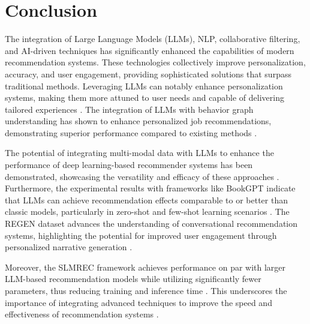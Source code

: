 \section{Conclusion} \label{sec:Conclusion}







The integration of Large Language Models (LLMs), NLP, collaborative filtering, and AI-driven techniques has significantly enhanced the capabilities of modern recommendation systems. These technologies collectively improve personalization, accuracy, and user engagement, providing sophisticated solutions that surpass traditional methods. Leveraging LLMs can notably enhance personalization systems, making them more attuned to user needs and capable of delivering tailored experiences \cite{chen2024large}. The integration of LLMs with behavior graph understanding has shown to enhance personalized job recommendations, demonstrating superior performance compared to existing methods \cite{wu2023exploringlargelanguagemodel}. 



The potential of integrating multi-modal data with LLMs to enhance the performance of deep learning-based recommender systems has been demonstrated, showcasing the versatility and efficacy of these approaches \cite{tian2024mmrecllmbasedmultimodal}. Furthermore, the experimental results with frameworks like BookGPT indicate that LLMs can achieve recommendation effects comparable to or better than classic models, particularly in zero-shot and few-shot learning scenarios \cite{zhiyuli2023bookgptgeneralframeworkbook}. The REGEN dataset advances the understanding of conversational recommendation systems, highlighting the potential for improved user engagement through personalized narrative generation \cite{sayana2024retrievalgeneratingnarrativesconversational}.



Moreover, the SLMREC framework achieves performance on par with larger LLM-based recommendation models while utilizing significantly fewer parameters, thus reducing training and inference time \cite{xu2024slmrecempoweringsmalllanguage}. This underscores the importance of integrating advanced techniques to improve the speed and effectiveness of recommendation systems \cite{li2024pretrainedlanguagemodelknowledge}.